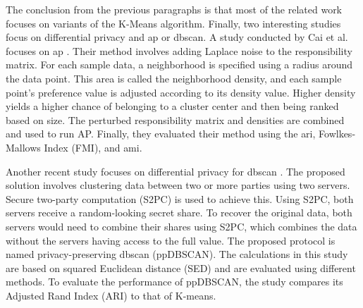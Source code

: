 The conclusion from the previous paragraphs is that most of the related work focuses on variants of the K-Means algorithm.
Finally, two interesting studies focus on differential privacy and \gls{ap} or \gls{dbscan}.
A study conducted by Cai et al. focuses on \gls{ap} \citep{cai_dp-ap_2020}.
Their method involves adding Laplace noise to the responsibility matrix.
For each sample data, a neighborhood is specified using a radius around the data point.
This area is called the neighborhood density, and each sample point’s preference value is adjusted according to its density value.
Higher density yields a higher chance of belonging to a cluster center and then being ranked based on size.
The perturbed responsibility matrix and densities are combined and used to run AP.
Finally, they evaluated their method using the  \gls{ari}, Fowlkes-Mallows Index (FMI), and \gls{ami}.

Another recent study focuses on differential privacy for \gls{dbscan} \citep{bozdemir_privacy-preserving_nodate}.
The proposed solution involves clustering data between two or more parties using two servers.
Secure two-party computation (S2PC) is used to achieve this.
Using S2PC, both servers receive a random-looking secret share.
To recover the original data, both servers would need to combine their shares using S2PC, which combines the data without the servers having access to the full value.
The proposed protocol is named privacy-preserving \gls{dbscan} (ppDBSCAN).
The calculations in this study are based on squared Euclidean distance (SED) and are evaluated using different methods.
To evaluate the performance of ppDBSCAN, the study compares its Adjusted Rand Index (ARI) to that of K-means.

